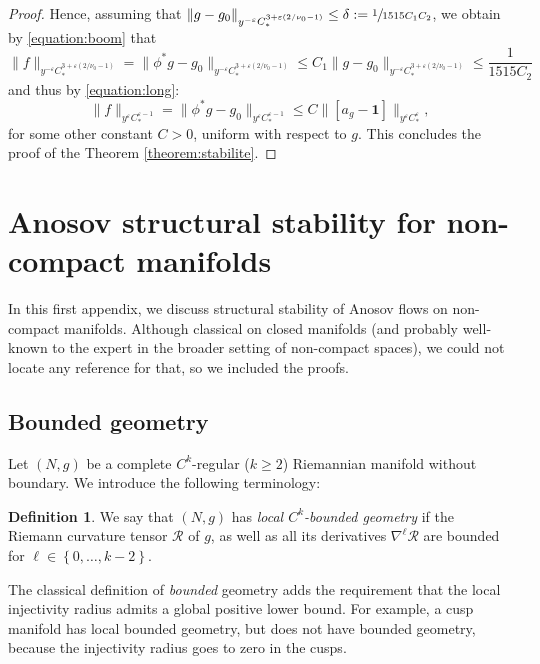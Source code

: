 \documentclass[JEP,XML,SOM,Unicode,NoFloatCountersInSection]{cedram}
\newcommand{\eps}{\varepsilon}
\theoremstyle{plain}
\theoremstyle{definition}
\newtheorem{definition}{Definition}[section]
\begin{document}
\begin{proof}
Hence, assuming that $\| g-g_0 \|_{y^{-\eps} C^{3+\eps(2/\nu_0-1)}_*} \leq \delta := \sfrac{1}{1515 C_1 C_2}$, we obtain by \eqref{equation:boom} that
\[
\|f\|_{y^{-\eps} C^{3+\eps(2/\nu_0-1)}_*} = \|\phi^*g-g_0\|_{y^{-\eps} C^{3+\eps(2/\nu_0-1)}_*} \leq C_1 \|g-g_0\|_{y^{-\eps} C^{3+\eps(2/\nu_0-1)}_*} \leq \frac{1}{1515 C_2}
\]
and thus by \eqref{equation:long}:
\[
\|f\|_{y^\eps C^{\eps-1}_*} = \|\phi^*g-g_0\|_{y^\eps C^{\eps-1}_*} \leq C \|[a_g-\mathbf{1}]\|_{y^\eps C^{\eps}_*},
\]
for some other constant $C > 0$, uniform with respect to $g$. This concludes the proof of the Theorem \ref{theorem:stabilite}.
\end{proof}

\appendix

\section{Anosov structural stability for non-compact manifolds}

\label{appendix:a}

In this first appendix, we discuss structural stability of Anosov flows on non-compact manifolds. Although classical on closed manifolds (and probably well-known to the expert in the broader setting of non-compact spaces), we could not locate any reference for that, so we included the proofs.

\subsection{Bounded geometry}

\label{ssection:bounded-geometry}

Let $(N,g)$ be a complete $C^k$-regular ($k\geq 2$) Riemannian manifold without boundary. We introduce the following terminology:

\begin{definition}
We say that $(N,g)$ has \emph{local $C^k$-bounded geometry} if the Riemann curvature tensor $\mathcal{R}$ of $g$, as well as all its derivatives $\nabla^\ell \mathcal{R}$ are bounded for $\ell \in \left\{0,\dots,k-2\right\}$.
\end{definition}

The classical definition of \emph{bounded} geometry adds the requirement that the local injectivity radius admits a global positive lower bound. For example, a cusp manifold has local bounded geometry, but does not have bounded geometry, because the injectivity radius goes to zero in the cusps.
\end{document}
